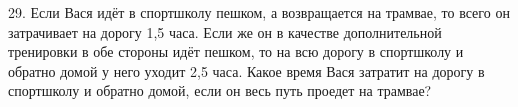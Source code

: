 29. Если Вася идёт в спортшколу пешком, а возвращается на трамвае, то всего он затрачивает на дорогу 1,5 часа. Если же он в качестве дополнительной тренировки в обе стороны идёт пешком, то на всю дорогу в спортшколу и обратно домой у него уходит 2,5 часа. Какое время Вася затратит на дорогу в спортшколу и обратно домой, если он весь путь проедет на трамвае?\\
